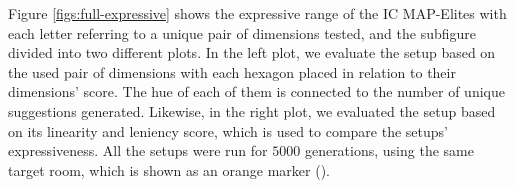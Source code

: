 

Figure \ref{figs:full-expressive} shows the expressive range of the IC MAP-Elites with each letter referring to a unique pair of dimensions tested, and the subfigure divided into two different plots. In the left plot, we evaluate the setup based on the used pair of dimensions with each hexagon placed in relation to their dimensions' score. The hue of each of them is connected to the number of unique suggestions generated. Likewise, in the right plot, we evaluated the setup based on its linearity and leniency score, which is used to compare the setups' expressiveness. All the setups were run for $5000$ generations, using the same target room, which is shown as an orange marker ().

